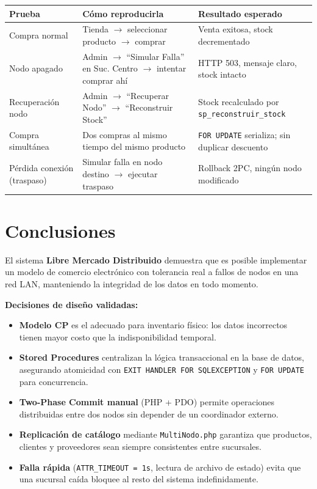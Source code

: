 \documentclass[11pt,a4paper]{article}
\newcommand{\code}[1]{\texttt{#1}}
\begin{document}
\begin{table}[h]
\centering
\begin{tabularx}{\textwidth}{@{}X X X@{}}
\toprule
\textbf{Prueba} & \textbf{Cómo reproducirla} & \textbf{Resultado esperado} \\
\midrule
Compra normal & Tienda $\rightarrow$ seleccionar producto $\rightarrow$ comprar & Venta exitosa, stock decrementado \\
Nodo apagado & Admin $\rightarrow$ ``Simular Falla'' en Suc. Centro $\rightarrow$ intentar comprar ahí & HTTP 503, mensaje claro, stock intacto \\
Recuperación nodo & Admin $\rightarrow$ ``Recuperar Nodo'' $\rightarrow$ ``Reconstruir Stock'' & Stock recalculado por \code{sp\_reconstruir\_stock} \\
Compra simultánea & Dos compras al mismo tiempo del mismo producto & \code{FOR UPDATE} serializa; sin duplicar descuento \\
Pérdida conexión (traspaso) & Simular falla en nodo destino $\rightarrow$ ejecutar traspaso & Rollback 2PC, ningún nodo modificado \\
\bottomrule
\end{tabularx}
\end{table}

\newpage
\section{Conclusiones}

El sistema \textbf{Libre Mercado Distribuido} demuestra que es posible implementar un modelo de comercio electrónico con tolerancia real a fallos de nodos en una red LAN, manteniendo la integridad de los datos en todo momento.

\textbf{Decisiones de diseño validadas:}

\begin{itemize}[nosep]
    \item \textbf{Modelo CP} es el adecuado para inventario físico: los datos incorrectos tienen mayor costo que la indisponibilidad temporal.
    \item \textbf{Stored Procedures} centralizan la lógica transaccional en la base de datos, asegurando atomicidad con \code{EXIT HANDLER FOR SQLEXCEPTION} y \code{FOR UPDATE} para concurrencia.
    \item \textbf{Two-Phase Commit manual} (PHP + PDO) permite operaciones distribuidas entre dos nodos sin depender de un coordinador externo.
    \item \textbf{Replicación de catálogo} mediante \code{MultiNodo.php} garantiza que productos, clientes y proveedores sean siempre consistentes entre sucursales.
    \item \textbf{Falla rápida} (\code{ATTR\_TIMEOUT = 1s}, lectura de archivo de estado) evita que una sucursal caída bloquee al resto del sistema indefinidamente.
\end{itemize}
\end{document}
